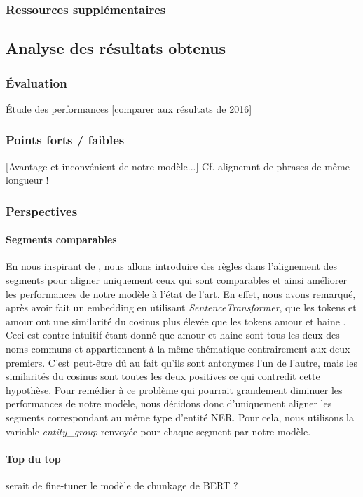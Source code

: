 \documentclass[a4paper, twoside, 11pt]{article}
\begin{document}
 \subsubsection{Ressources supplémentaires}

 \subsection{Analyse des résultats obtenus}
 \subsubsection{Évaluation}
 Étude des performances
 [comparer aux résultats de 2016]
 \subsubsection{Points forts / faibles}
 [Avantage et inconvénient de notre modèle...]
 Cf. alignemnt de phrases de même longueur !
 \subsubsection{Perspectives}
 \paragraph{Segments comparables}
       \hfill \break
En nous inspirant de \cite{banjade}, nous allons introduire des règles dans l’alignement des segments pour aligner uniquement ceux qui sont \og comparables \fg{} et ainsi améliorer les performances de notre modèle à l'état de l'art. En effet, nous avons remarqué, après avoir fait un \og embedding \fg{} en utilisant \textit{SentenceTransformer}, que les tokens  \fg{} et \og amour \fg{} ont une similarité du cosinus plus élevée que les tokens \og amour \fg{} et  \og haine \fg{}. Ceci est contre-intuitif étant donné que \og amour \fg{} et \og haine \fg{} sont tous les deux des noms communs et appartiennent à la même thématique contrairement aux deux premiers. C'est peut-être dû au fait qu'ils sont antonymes l’un de l’autre, mais les similarités du cosinus sont toutes les deux positives ce qui contredit cette hypothèse.
Pour remédier à ce problème qui pourrait grandement diminuer les performances de notre modèle, nous décidons donc d’uniquement aligner les segments correspondant au même type d’entité NER. Pour cela, nous utilisons la variable \textit{entity\_group} renvoyée pour chaque segment par notre modèle.
 \paragraph{Top du top} serait de fine-tuner le modèle de chunkage de BERT ?
    \printbibliography
\end{document}
